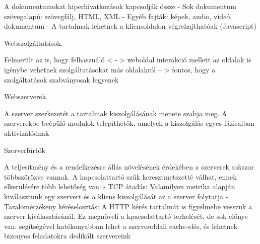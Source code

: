\documentclass[12pt]{article}
\begin{document}
\begin{description}
                                                                        A dokumentumokat hiperhivatkozások kapcsolják össze
                                                                        - Sok dokumentum szövegalapú: szövegfálj, HTML, XML
                                                                        - Egyéb fajták: képek, audio, videó, dokumentum
                                                                        - A tartalmak lehetnek a kliensoldalon végrehajthatóak (Javascript)
                                                                    \item  Webszolgáltatások.
                                                                    \item Felmerült az is, hogy felhasználó < - > weboldal interakció mellett az oldalak is igénybe vehetnek szolgáltatásokat más
                                                                        oldalakról -- > fontos, hogy a szolgáltatások szabványosak legyenek
                                                                    \item  Webszerverek.
                                                                    \item A szerver szerkezetét a tartalmak kiszolgálásának menete szabja meg. A szerverekbe beépülő modulok telepíthetők,
                                                                        amelyek a kiszolgálás egyes fázisaiban aktivizálódnak
                                                                    \item  Szerverfürtök    
                                                                    \item A teljesítmény és a rendelkezésre állás növelésének érdekében a szerverek sokszor többszörözve vannak.
                                                                        A kapcsolattartó szűk keresztmetszetté válhat, ennek elkerülésére több lehetőség van:
                                                                        - TCP átadás: Valamilyen metrika alapján kiválasztunk egy szervert és a kliens kiszolgálását az a szerver folytatja
                                                                        - Taralomérzékeny kéréselosztás: A HTTP kérés tartalmát is figyelmebe vesszük a szerver kiválasztásánál. Ez megnöveli
                                                                        a kpacsolattartó terhelését, de sok előnye van: segítségével hatékonyabban lehet a szerveroldali cache-elés, és lehetnek
                                                                        bizonyos feladatokra dedikált szervereink

\end{description}
\end{document}
